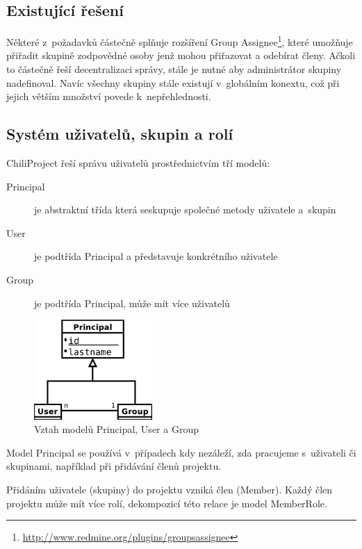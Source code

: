 \documentclass[thesis=B,czech]{FITthesis}[2012/05/02]
\begin{document}
\subsection{Existující řešení}

Některé z~požadavků částečně splňuje rozšíření Group Assignee\footnote{\url{http://www.redmine.org/plugins/groupsassignee}},
které umožňuje přiřadit skupině zodpovědné osoby jenž mohou přiřazovat a
odebírat členy. Ačkoli to částečně řeší decentralizaci správy, stále je
nutné aby administrátor skupiny nadefinoval. Navíc všechny skupiny stále
existují v~globálním konextu, což při jejich větším množství povede
k~nepřehlednosti.

\subsection{Systém uživatelů, skupin a rolí}

\label{sec:proj_group_sys}

ChiliProject řeší správu uživatelů prostřednictvím tří modelů:

\begin{description}
\item[Principal] je abstraktní třída která seskupuje společné metody
  uživatele \mbox{a~skupin}
\item[User] je podtřída Principal a představuje konkrétního
  uživatele
\item[Group] je podtřída Principal, může mít více uživatelů
\end{description}

\begin{figure}[htbp]
\centering
\includegraphics[width=0.4\textwidth]{group-er1.pdf}
\caption{Vztah modelů Principal, User a Group}
\end{figure}

Model Principal se používá v~případech kdy nezáleží, zda pracujeme
s~uživateli či skupinami, například při přidávání členů projektu.

Přidáním uživatele (skupiny) do projektu vzniká člen (Member). Každý
člen projektu může mít více rolí, dekompozicí této relace je model
\mbox{MemberRole}.
\end{document}
